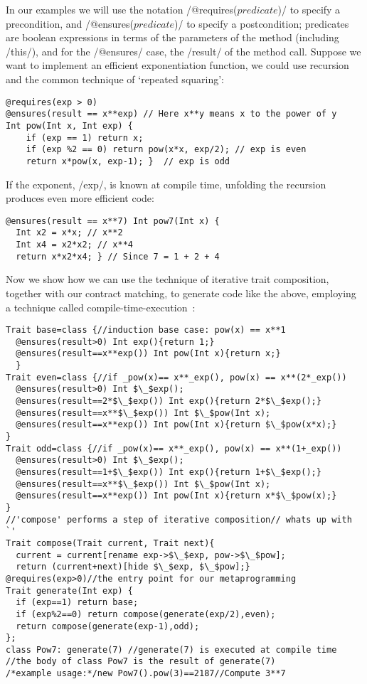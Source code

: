 In our examples we will use the notation /@requires($predicate$)/ 
to specify a precondition, and /@ensures($predicate$)/ 
to specify a postcondition; predicates are boolean expressions
in terms of the parameters of the method (including /this/), and for the /@ensures/ case, the /result/ of the method call.
Suppose we want to implement an efficient exponentiation function, we could use recursion and the common technique of `repeated squaring':
\vspace{-1ex}
\begin{lstlisting}
@requires(exp > 0)
@ensures(result == x**exp) // Here x**y means x to the power of y
Int pow(Int x, Int exp) {
	if (exp == 1) return x;
	if (exp %2 == 0) return pow(x*x, exp/2); // exp is even
	return x*pow(x, exp-1); }  // exp is odd
\end{lstlisting}
If the exponent, /exp/, is known at compile time,
unfolding the recursion produces even more efficient code:
\vspace{-1ex}
\begin{lstlisting}[firstnumber=7]
@ensures(result == x**7) Int pow7(Int x) { 
  Int x2 = x*x; // x**2
  Int x4 = x2*x2; // x**4
  return x*x2*x4; } // Since 7 = 1 + 2 + 4
\end{lstlisting}
\vspace{-1ex}
Now we show how we can use the technique of iterative trait composition, together with our contract matching, to generate code like the above, employing a technique called compile-time-execution~\cite{sheard2002template}:
\vspace{-1ex}
\begin{lstlisting}[firstnumber=11]
Trait base=class {//induction base case: pow(x) == x**1
  @ensures(result>0) Int exp(){return 1;}  
  @ensures(result==x**exp()) Int pow(Int x){return x;}
  }
Trait even=class {//if _pow(x)== x**_exp(), pow(x) == x**(2*_exp())
  @ensures(result>0) Int $\_$exp();
  @ensures(result==2*$\_$exp()) Int exp(){return 2*$\_$exp();}
  @ensures(result==x**$\_$exp()) Int $\_$pow(Int x);
  @ensures(result==x**exp()) Int pow(Int x){return $\_$pow(x*x);}
}
Trait odd=class {//if _pow(x)== x**_exp(), pow(x) == x**(1+_exp())
  @ensures(result>0) Int $\_$exp();
  @ensures(result==1+$\_$exp()) Int exp(){return 1+$\_$exp();}
  @ensures(result==x**$\_$exp()) Int $\_$pow(Int x);
  @ensures(result==x**exp()) Int pow(Int x){return x*$\_$pow(x);}
}
//'compose' performs a step of iterative composition// whats up with `'
Trait compose(Trait current, Trait next){
  current = current[rename exp->$\_$exp, pow->$\_$pow];
  return (current+next)[hide $\_$exp, $\_$pow];}
@requires(exp>0)//the entry point for our metaprogramming
Trait generate(Int exp) {
  if (exp==1) return base;
  if (exp%2==0) return compose(generate(exp/2),even);
  return compose(generate(exp-1),odd);
};
class Pow7: generate(7) //generate(7) is executed at compile time
//the body of class Pow7 is the result of generate(7)
/*example usage:*/new Pow7().pow(3)==2187//Compute 3**7
\end{lstlisting}
\vspace{-1ex}